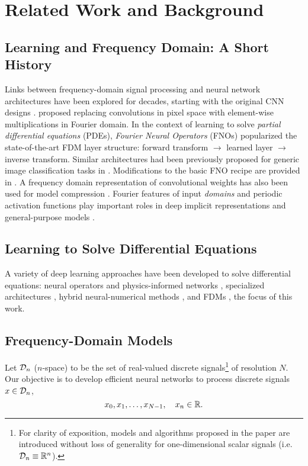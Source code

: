 \section{Related Work and Background}
%
\subsection{Learning and Frequency Domain: A Short History}\label{subsec:history}
%
Links between frequency-domain signal processing and neural network architectures have been explored for decades, starting with the original CNN designs \citep{fukushima1982neocognitron}. \cite{mathieu2013fast,rippel2015spectral} proposed replacing convolutions in pixel space with element-wise multiplications in Fourier domain. In the context of learning to solve \textit{partial differential equations} (PDEs), \textit{Fourier Neural Operators} (FNOs) \citep{li2020fourier} popularized the state-of-the-art FDM layer structure: forward transform $\rightarrow$ learned layer $\rightarrow$ inverse transform. Similar architectures had been previously proposed for generic image classification tasks in \citep{pratt2017fcnn,chi2020fast}. Modifications to the basic FNO recipe are provided in \citep{tran2021factorized,guibas2021adaptive,wen2022u}. A frequency domain representation of convolutional weights has also been used for model compression \citep{chen2016compressing}. Fourier features of input \textit{domains} and periodic activation functions play important roles in deep implicit representations \citep{sitzmann2020implicit,dupont2021coin,poli2022self} and general-purpose models \citep{jaegle2021perceiver}.
%

\subsection{Learning to Solve Differential Equations}
%
A variety of deep learning approaches have been developed to solve differential equations: neural operators and physics-informed networks \citep{pmlr-v80-long18a,raissi2019physics,lu2019deeponet,karniadakis2021physics}, specialized architectures \citep{wang2020towards,lienen2022learning}, hybrid neural-numerical methods \citep{poli2020hypersolvers,kochkov2021machine,mathiesen2022hyperverlet, berto2022neural}, and FDMs \citep{li2020fourier,tran2021factorized}, the focus of this work.



\subsection{Frequency-Domain Models}\label{subsec:background}
Let $\mathcal{D}_n$ ($n$-space) to be the set of real-valued discrete signals\footnote{For clarity of exposition, models and algorithms proposed in the paper are introduced without loss of generality for one-dimensional scalar signals (i.e. $\mathcal{D}_n\equiv\mathbb{R}^n$).} of resolution $N$.
Our objective is to develop efficient neural networks to process discrete signals $x\in\mathcal{D}_n$,
%
\[
    x_0, x_1, \dots,x_{N-1},\quad x_n\in\mathbb{R}.
\]

